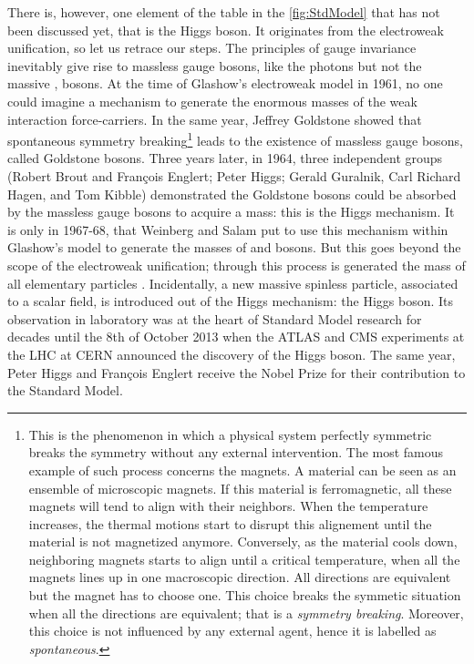 There is, however, one element of the table in the \fig\ref{fig:StdModel} that has not been discussed yet, that is the Higgs boson. It originates from the electroweak unification, so let us retrace our steps. The principles of gauge invariance inevitably give rise to massless gauge bosons, like the photons but not the massive \rmWplusminus, \rmZzero bosons. At the time of Glashow's electroweak model in 1961, no one could imagine a mechanism to generate the enormous masses of the weak interaction force-carriers. In the same year, Jeffrey Goldstone showed that spontaneous symmetry breaking\footnote{This is the phenomenon in which a physical system perfectly symmetric breaks the symmetry without any external intervention. The most famous example of such process concerns the magnets. A material can be seen as an ensemble of microscopic magnets. If this material is ferromagnetic, all these magnets will tend to align with their neighbors.  When the temperature increases, the thermal motions start to disrupt this alignement until the material is not magnetized anymore. Conversely, as the material cools down, neighboring magnets starts to align until a critical temperature, when all the magnets lines up in one macroscopic direction. All directions are equivalent but the magnet has to choose one. This choice breaks the symmetic situation when all the directions are equivalent; that is a \textit{symmetry breaking}. Moreover, this choice is not influenced by any external agent, hence it is labelled as \textit{spontaneous}.} leads to the existence of massless gauge bosons, called Goldstone bosons. Three years later, in 1964, three independent groups (Robert Brout and François Englert; Peter Higgs; Gerald Guralnik, Carl Richard Hagen, and Tom Kibble) demonstrated the Goldstone bosons could be absorbed by the massless gauge bosons to acquire a mass: this is the Higgs mechanism. It is only in 1967-68, that Weinberg and Salam put to use this mechanism within Glashow's model to generate the masses of \rmWplusminus and \rmZzero bosons. But this goes beyond the scope of the electroweak unification; through this process is generated the mass of all elementary particles \cite{s.glashowInteractionsJourneyMind1990}. Incidentally, a new massive spinless particle, associated to a scalar field, is introduced out of the Higgs mechanism: the Higgs boson. Its observation in laboratory was at the heart of Standard Model research for decades until the 8th of October 2013 when the ATLAS and CMS experiments at the LHC at CERN announced the discovery of the Higgs boson. The same year, Peter Higgs and François Englert receive the Nobel Prize for their contribution to the Standard Model.


